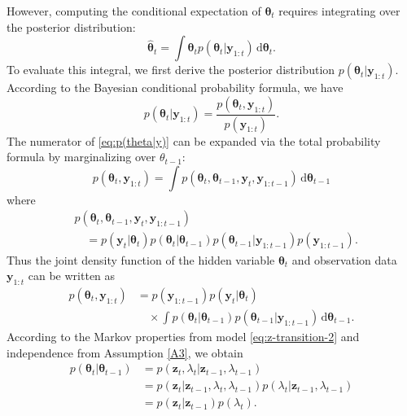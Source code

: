 \documentclass[10pt,twocolumn,twoside]{IEEEtran}
\newcommand{\fs}{\text{.}} %
\newcommand{\y}{{ \bm{y} }}
\newcommand{\z}{{ \bm{z} }}
\begin{document}
However, computing the conditional expectation of $\bm\theta_t$ requires integrating over the posterior distribution:
\begin{equation} \label{eq:estimate-MMSE}
    \hat{\bm\theta}_t = \int{\bm\theta_tp(\bm\theta_t|\y_{1:t})}\,\mathrm{d}\bm\theta_t \fs
\end{equation}
To evaluate this integral, we first derive the posterior distribution $p(\bm\theta_t|\y_{1:t})$. According to the Bayesian conditional probability formula, we have
\begin{equation} \label{eq:p(theta|y)}
    p(\bm\theta_t|\y_{1:t}) = \frac{p(\bm\theta_t,\y_{1:t})}{p(\y_{1:t})} \fs
\end{equation}
The numerator of \eqref{eq:p(theta|y)} can be expanded via the total probability formula by marginalizing over $\theta_{t-1}$:
$$
p(\bm\theta_t,\y_{1:t}) = \int p(\bm\theta_t,\bm\theta_{t-1},\y_t,\y_{1:t-1})\,\mathrm{d}\bm\theta_{t-1}
$$
where
\begin{equation*}
\begin{split}
    &p(\bm\theta_t,\bm\theta_{t-1},\y_t,\y_{1:t-1}) \\
    &\quad= p(\y_t|\bm\theta_t)p(\bm\theta_t|\bm\theta_{t-1})p(\bm\theta_{t-1}|\y_{1:t-1})p(\y_{1:t-1}) \fs
\end{split}
\end{equation*}
Thus the joint density function of the hidden variable $\bm\theta_t$ and observation data $\y_{1:t}$ can be written as
\begin{equation} \label{eq:joint-pdf}
\begin{split}
    p(\bm\theta_t,\y_{1:t})
    &= p(\y_{1:t-1})p(\y_t|\bm\theta_t)\\
    &\quad\times\int p(\bm\theta_t|\bm\theta_{t-1})p(\bm\theta_{t-1}|\y_{1:t-1})\,\mathrm{d}\bm\theta_{t-1} \fs
\end{split}
\end{equation}
According to the Markov properties from model \eqref{eq:z-transition-2} and independence from Assumption \ref{A3}, we obtain
\begin{equation} \label{eq:transition-pdf}
\begin{split}
    p(\bm\theta_t|\bm\theta_{t-1}) &= p(\z_t,\lambda_t|\z_{t-1},\lambda_{t-1}) \\
    &= p(\z_t|\z_{t-1},\lambda_t,\lambda_{t-1}) p(\lambda_t|\z_{t-1},\lambda_{t-1}) \\
    &= p(\z_t|\z_{t-1})p(\lambda_t) \fs
\end{split}
\end{equation}
\end{document}
